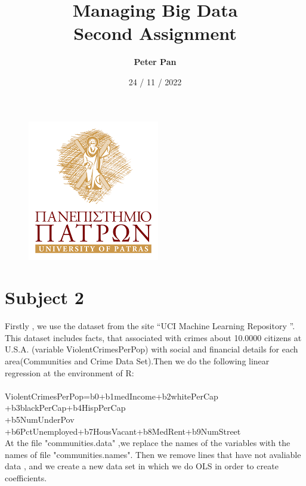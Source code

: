 \documentclass[10pt,a4paper]{article}
\begin{document}
	\begin{figure}
		\includegraphics[scale=0.7]{econpic}
		\centering
	\end{figure}
	\title { {\Huge Managing Big Data} \\ 
		Second Assignment }
	\author{
		\textbf{Peter Pan} \\
	}
	\date{ 24 / 11 / 2022 }
	
	
	\maketitle
	
	\newpage
	
	\tableofcontents
	
	\newpage
	\section{}
	\section{Subject 2}
Firstly , we use the dataset from the site “UCI Machine Learning Repository ”. This dataset includes facts, that associated with crimes about 10.0000 citizens at U.S.A. (variable ViolentCrimesPerPop) with social and financial details for each area(Communities and Crime Data Set).Then we do the following linear regression at the environment of R:\\
	\\
ViolentCrimesPerPop=b0+b1medIncome+b2whitePerCap
+b3blackPerCap+b4HispPerCap\\+b5NumUnderPov
+b6PctUnemployed+b7HousVacant+b8MedRent+b9NumStreet\\
	
At the file "communities.data" ,we replace the names of the variables with the names of file "communities.names". Then we remove lines that have not avaliable data , and we create a new data set in which we do OLS in order to create coefficients.
	
\end{document}
